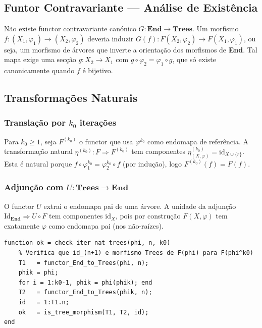\subsection{Funtor Contravariante --- Análise de Existência}

\begin{proposition}
Não existe functor contravariante canónico $G: \mathbf{End} \to \mathbf{Trees}$. Um morfismo $f: (X_1, \varphi_1) \to (X_2, \varphi_2)$ deveria induzir $G(f): F(X_2, \varphi_2) \to F(X_1, \varphi_1)$, ou seja, um morfismo de árvores que inverte a orientação dos morfismos de \textbf{End}. Tal mapa exige uma secção $g: X_2 \to X_1$ com $g \circ \varphi_2 = \varphi_1 \circ g$, que só existe canonicamente quando $f$ é bijetivo.
\end{proposition}

\subsection{Transformações Naturais}

\subsubsection{Translação por $k_0$ iterações}

Para $k_0 \geq 1$, seja $F^{(k_0)}$ o functor que usa $\varphi^{k_0}$ como endomapa de referência. A transformação natural $\eta^{(k_0)}: F \Rightarrow F^{(k_0)}$ tem componentes $\eta^{(k_0)}_{(X,\varphi)} = \mathrm{id}_{X \cup \{r\}}$. Esta é natural porque $f \circ \varphi_1^{k_0} = \varphi_2^{k_0} \circ f$ (por indução), logo $F^{(k_0)}(f) = F(f)$.

\subsubsection{Adjunção com $U: \mathbf{Trees} \to \mathbf{End}$}

O functor $U$ extrai o endomapa pai de uma árvore. A unidade da adjunção $\mathrm{Id}_{\mathbf{End}} \Rightarrow U \circ F$ tem componentes $\mathrm{id}_X$, pois por construção $F(X, \varphi)$ tem exatamente $\varphi$ como endomapa pai (nos não-raízes).

\begin{lstlisting}[style=matlab, caption={Verificação da naturalidade $\eta^{(k_0)}: F \Rightarrow F^{(k_0)}$}]
function ok = check_iter_nat_trees(phi, n, k0)
    % Verifica que id_(n+1) e morfismo Trees de F(phi) para F(phi^k0)
    T1   = functor_End_to_Trees(phi, n);
    phik = phi;
    for i = 1:k0-1, phik = phi(phik); end
    T2   = functor_End_to_Trees(phik, n);
    id   = 1:T1.n;
    ok   = is_tree_morphism(T1, T2, id);
end
\end{lstlisting}
